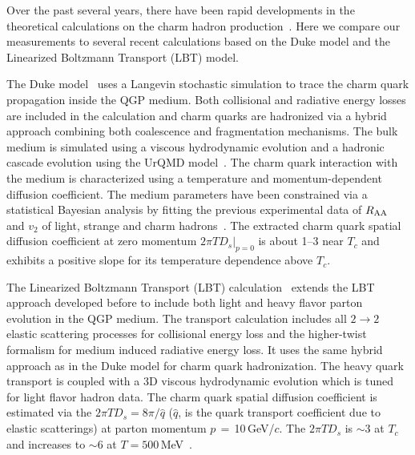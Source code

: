 \documentclass[%
 reprint,	
 amsmath,amssymb,
 aps,
 prc,
]{revtex4-1}
\begin{document}
Over the past several years, there have been rapid developments in the theoretical calculations on the charm hadron production~\cite{Rapp:2018qla,Cao:2018ews}. Here we compare our measurements to several recent calculations based on the Duke model and the Linearized Boltzmann Transport (LBT) model.

The Duke model~\cite{Duke,Xu:2017obm} uses a Langevin stochastic simulation to trace the charm quark propagation inside the QGP medium. Both collisional and radiative energy losses are included in the calculation and charm quarks are hadronized via a hybrid approach combining both coalescence and fragmentation mechanisms. The bulk medium is simulated using a viscous hydrodynamic evolution and a hadronic cascade evolution using the UrQMD model~\cite{urQMD}. The charm quark interaction with the medium is characterized using a temperature and momentum-dependent diffusion coefficient. The medium parameters have been constrained via a statistical Bayesian analysis by fitting the previous experimental data of $R_{\rm AA}$ and $v_{2}$ of light, strange and charm hadrons~\cite{Xu:2017obm}. The extracted charm quark spatial diffusion coefficient at zero momentum $2\pi TD_s|_{p=0}$ is about 1--3 near $T_{c}$ and exhibits a positive slope for its temperature dependence above $T_{c}$.

The Linearized Boltzmann Transport (LBT) calculation~\cite{Cao:2016gvr} extends the LBT approach developed before to include both light and heavy flavor parton evolution in the QGP medium. The transport calculation includes all $2\rightarrow 2$ elastic scattering processes for collisional energy loss and the higher-twist formalism for medium induced radiative energy loss. It uses the same hybrid approach as in the Duke model for charm quark hadronization. The heavy quark transport is coupled with a 3D viscous hydrodynamic evolution which is tuned for light flavor hadron data. The charm quark spatial diffusion coefficient is estimated via the $2\pi TD_s =8\pi/\hat{q}$ ($\hat{q}$, is the quark transport coefficient due to elastic scatterings) at parton momentum $p$\,$=$\,10\,GeV/$c$. The $2\pi TD_s$ is $\sim$3 at $T_{c}$ and increases to $\sim$6 at $T = 500$\,MeV~\cite{LBT:private}.
\end{document}
